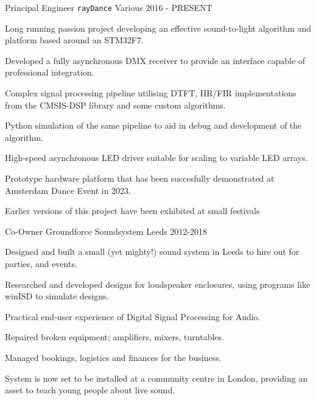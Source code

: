 

\begin{cventries}

  \cventry
    {Principal Engineer} %
    {\texttt{rayDance}} %
    {Various} %
    {2016 - PRESENT} %
    {
      Long running passion project developing an effective sound-to-light algorithm and platform based around an STM32F7.
      \begin{cvitems} %
        \item {Developed a fully asynchronous DMX receiver to provide an interface capable of professional integration.}
        \item {Complex signal processing pipeline utilising DTFT, IIR/FIR implementations from the CMSIS-DSP library and some custom algorithms.}
        \item {Python simulation of the same pipeline to aid in debug and development of the algorithm.}
        \item {High-speed asynchronous LED driver suitable for scaling to variable LED arrays.}
        \item {Prototype hardware platform that has been succesfully demonstrated at Amsterdam Dance Event in 2023.}
        \item {Earlier versions of this project have been exhibited at small festivals}
      \end{cvitems}
    }

    \cventry
    {Co-Owner}
    {Groundforce Soundsystem}
    {Leeds}
    {2012-2018}
    {Designed and built a small (yet mighty!) sound system in Leeds to hire out for parties, and events.
    \begin{cvitems}
        \item Researched and developed designs for loudspeaker enclosures, using programs like winISD to simulate designs.
        \item Practical end-user experience of Digital Signal Processing for Audio.
        \item Repaired broken equipment; amplifiers, mixers, turntables.
        \item Managed bookings, logistics and finances for the business.
        \item System is now set to be installed at a community centre in London, providing an asset to teach young people about live sound.
    \end{cvitems}
    }

\end{cventries}
